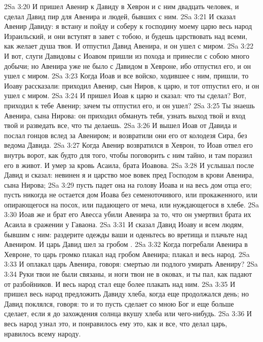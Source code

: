 \vs 2Sa 3:20 И пришел Авенир к Давиду в Хеврон и с ним двадцать человек, и сделал Давид пир для Авенира и людей, бывших с ним.
\vs 2Sa 3:21 И сказал Авенир Давиду: я встану и пойду и соберу к господину моему царю весь народ Израильский, и они вступят в завет с тобою, и будешь царствовать над всеми, как желает душа твоя. И отпустил Давид Авенира, и он ушел с миром.
\vs 2Sa 3:22 И вот, слуги Давидовы с Иоавом пришли из похода и принесли с собою много добычи; но Авенира уже не было с Давидом в Хевроне, ибо  отпустил его, и он ушел с миром.
\vs 2Sa 3:23 Когда Иоав и все войско, ходившее с ним, пришли, то Иоаву рассказали: приходил Авенир, сын Ниров, к царю, и тот отпустил его, и он ушел с миром.
\vs 2Sa 3:24 И пришел Иоав к царю и сказал: что ты сделал? Вот, приходил к тебе Авенир; зачем ты отпустил его, и он ушел?
\vs 2Sa 3:25 Ты знаешь Авенира, сына Нирова: он приходил обмануть тебя, узнать выход твой и вход твой и разведать все, что ты делаешь.
\vs 2Sa 3:26 И вышел Иоав от Давида и послал гонцов вслед за Авениром; и возвратили они его от колодезя Сира, без ведома Давида.
\vs 2Sa 3:27 Когда Авенир возвратился в Хеврон, то Иоав отвел его внутрь ворот, как будто для того, чтобы поговорить с ним тайно, и там поразил его в живот. И умер  за кровь Асаила, брата Иоавова.
\vs 2Sa 3:28 И услышал после Давид  и сказал: невинен я и царство мое вовек пред Господом в крови Авенира, сына Нирова;
\vs 2Sa 3:29 пусть падет она на голову Иоава и на весь дом отца его; пусть никогда не остается дом Иоава без семеноточивого, или прокаженного, или опирающегося на посох, или падающего от меча, или нуждающегося в хлебе.
\vs 2Sa 3:30 Иоав же и брат его Авесса убили Авенира за то, что он умертвил брата их Асаила в сражении у Гаваона.
\vs 2Sa 3:31 И сказал Давид Иоаву и всем людям, бывшим с ним: раздерите одежды ваши и оденьтесь во вретища и плачьте над Авениром. И царь Давид шел за гробом .
\vs 2Sa 3:32 Когда погребали Авенира в Хевроне, то царь громко плакал над гробом Авенира; плакал и весь народ.
\vs 2Sa 3:33 И оплакал царь Авенира, говоря: смертью ли подлого умирать Авениру?
\vs 2Sa 3:34 Руки твои не были связаны, и ноги твои не в оковах, и ты пал, как падают от разбойников. И весь народ стал еще более плакать над ним.
\vs 2Sa 3:35 И пришел весь народ предложить Давиду хлеба, когда еще продолжался день; но Давид поклялся, говоря: то и то пусть сделает со мною Бог и еще больше сделает, если я до захождения солнца вкушу хлеба или чего-нибудь.
\vs 2Sa 3:36 И весь народ узнал это, и понравилось ему это, как и все, что делал царь, нравилось всему народу.
